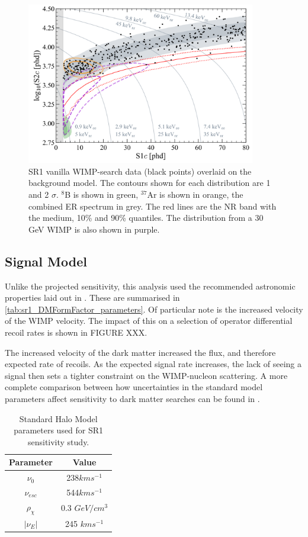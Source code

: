\begin{figure}
    \centering
    \includegraphics[width=10cm]{Figures/EFT/All_SR1_Plots/final_data_points.png}
    \caption{SR1 vanilla WIMP-search data (black points) overlaid on the background model.
    The contours shown for each distribution are 1 and 2 $\sigma$.
    ${}^{8}$B is shown in green, ${}^{37}$Ar is shown in orange, the combined ER spectrum in grey.
    The red lines are the NR band with the medium, 10\% and 90\% quantiles.
    The distribution from a 30 GeV WIMP is also shown in purple. 
    }
    \label{fig:final_data_points}
\end{figure}

\subsection{Signal Model}
\par
Unlike the projected sensitivity, this analysis used the recommended astronomic properties laid out in \cite{standard_halo_model_conventions_ref}.
These are summarised in \autoref{tab:sr1_DMFormFactor_parameters}.
Of particular note is the increased velocity of the WIMP velocity.
The impact of this on a selection of operator differential recoil rates is shown in FIGURE XXX.
\par
The increased velocity of the dark matter increased the flux, and therefore expected rate of recoils.
As the expected signal rate increases, the lack of seeing a signal then sets a tighter constraint on the WIMP-nucleon scattering.
A more complete comparison between how uncertainties in the standard model parameters affect sensitivity to dark matter searches can be found in \cite{LZ_Ibles_LZStats_Thesis_ref,billyboxer_thesis_ref}.

\begin{table}[]
    \centering
    \begin{tabular}{c|c}
        Parameter         & Value  \\ \hline
        $\nu_0$           & 238$km s^{-1}$ \\
        $\nu_{esc}$       & 544$km s^{-1}$ \\
        $\rho_{\chi}$     & 0.3 $GeV/cm^{3}$ \\
        $|\nu_E|$         & 245 $km s^{-1}$ 
    \end{tabular}
    \caption{Standard Halo Model parameters used for SR1 sensitivity study.}
    \label{tab:sr1_DMFormFactor_parameters}
\end{table}


